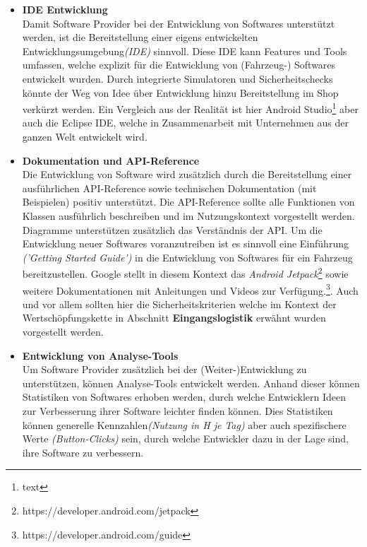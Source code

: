 \begin{itemize}
	\item[] \hspace{-0.6cm} \textbf{IDE Entwicklung}\\
	Damit Software Provider bei der Entwicklung von Softwares unterstützt werden, ist die Bereitstellung einer eigens entwickelten Entwicklungsumgebung\textit{(IDE)} sinnvoll. 
	Diese IDE kann Features und Tools umfassen, welche explizit für die Entwicklung von (Fahrzeug-) Softwares entwickelt wurden. Durch integrierte Simulatoren und Sicherheitschecks könnte der Weg von Idee über Entwicklung hinzu Bereitstellung im Shop verkürzt werden. Ein Vergleich aus der Realität ist hier Android Studio\footnote{text} aber auch die Eclipse IDE, welche in Zusammenarbeit mit Unternehmen aus der ganzen Welt entwickelt wird.
	
	\item[] \hspace{-0.6cm} \textbf{Dokumentation und API-Reference}\\
	Die Entwicklung von Software wird zusätzlich durch die Bereitstellung einer ausführlichen API-Reference sowie technischen Dokumentation (mit Beispielen) positiv unterstützt. Die API-Reference sollte alle Funktionen von Klassen ausführlich beschreiben und im Nutzungskontext vorgestellt werden. Diagramme unterstützen zusätzlich das Verständnis der API. Um die Entwicklung neuer Softwares voranzutreiben ist es sinnvoll eine Einführung \textit{('Getting Started Guide')} in die Entwicklung von Softwares für ein Fahrzeug bereitzustellen. Google stellt in diesem Kontext das \textit{Android Jetpack}\footnote{https://developer.android.com/jetpack} sowie weitere Dokumentationen mit Anleitungen und Videos zur Verfügung.\footnote{https://developer.android.com/guide}. Auch und vor allem sollten hier die Sicherheitskriterien welche im Kontext der Wertschöpfungskette in Abschnitt \textbf{Eingangslogistik} erwähnt wurden vorgestellt werden. 
	
	\item[] \hspace{-0.6cm} \textbf{Entwicklung von Analyse-Tools}\\
	Um Software Provider zusätzlich bei der (Weiter-)Entwicklung zu unterstützen, können Analyse-Tools entwickelt werden. Anhand dieser können Statistiken von Softwares erhoben werden, durch welche Entwicklern Ideen zur Verbesserung ihrer Software leichter finden können. Dies Statistiken können generelle Kennzahlen\textit{(Nutzung in H je Tag)} aber auch spezifischere Werte \textit{(Button-Clicks)} sein, durch welche Entwickler dazu in der Lage sind, ihre Software zu verbessern.
	

\end{itemize}
